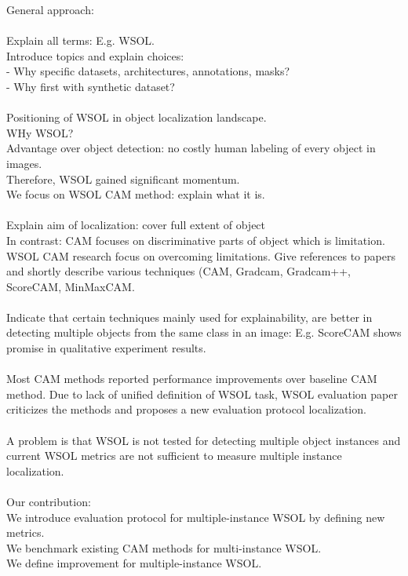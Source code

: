 General approach:
\\\\
Explain all terms: E.g. WSOL.
\\
Introduce topics and explain choices:\\
- Why specific datasets, architectures, annotations, masks?\\
- Why first with synthetic dataset?\\
\\
Positioning of WSOL in object localization landscape.
\\
WHy WSOL? \\ 
Advantage over object detection: no costly human labeling of every object in images.\\
Therefore, WSOL gained significant momentum. \\
We focus on WSOL CAM method: explain what it is. \\
\\
Explain aim of localization: cover full extent of object \\
In contrast: CAM focuses on discriminative parts of object which is limitation. \\
WSOL CAM research focus on overcoming limitations. Give references to papers and shortly describe various techniques (CAM, Gradcam, Gradcam++, ScoreCAM, MinMaxCAM. \\
\\
Indicate that certain techniques mainly used for explainability, are better in detecting multiple objects from the same class in an image: E.g. ScoreCAM shows promise in qualitative experiment results.\\
\\
Most CAM methods reported performance improvements over baseline CAM method. Due to lack of unified definition of WSOL task, WSOL evaluation paper criticizes the methods and proposes a new evaluation protocol localization. \\
\\
A problem is that WSOL is not tested for detecting multiple object instances and current WSOL metrics are not sufficient to measure multiple instance localization.\\
\\
Our contribution:
\\
We introduce evaluation protocol for multiple-instance WSOL by defining new metrics. \\
We benchmark existing CAM methods for multi-instance WSOL.\\
We define improvement for multiple-instance WSOL.\\

